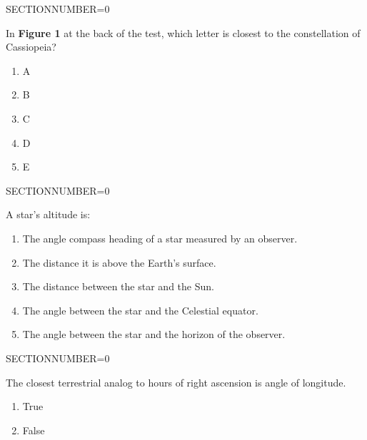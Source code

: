 \documentclass[11pt]{article}
\begin{document}
\begin{enumerate}
\begin{minipage}{\textwidth}
\begin{minipage}{\textwidth}
\end{minipage}
SECTIONNUMBER=0
\end{minipage}
\vskip 0.20in

\begin{minipage}{\textwidth}
\begin{minipage}{\textwidth}
\item In {\bf Figure 1} at the back of the test, which letter is closest to the constellation of  Cassiopeia?
\begin{multicols}{3}
\begin{enumerate} 
\setlength{\itemsep}{1pt} 
\setlength{\parskip}{0pt} 
\setlength{\parsep}{0pt}
\setlength{\multicolsep}{1pt} 
\item A
\item B
\item C
\item D
\item E
\end{enumerate} 
\vfill 
\end{multicols}

\end{minipage}
SECTIONNUMBER=0
\end{minipage}
\vskip 0.20in

\begin{minipage}{\textwidth}
\begin{minipage}{\textwidth}
\item A star's altitude is:
\begin{enumerate} 
\setlength{\itemsep}{1pt} 
\setlength{\parskip}{0pt} 
\setlength{\parsep}{0pt}
\setlength{\multicolsep}{1pt} 
\item The angle compass heading of a star measured by an observer.
\item The distance it is above the Earth's surface.
\item The distance between the star and the Sun.
\item The angle between the star and the Celestial equator.
\item The angle between the star and the horizon of the observer.
\end{enumerate} 
\end{minipage}
SECTIONNUMBER=0
\end{minipage}
\vskip 0.20in

\begin{minipage}{\textwidth}
\begin{minipage}{\textwidth}
\item The closest terrestrial analog to hours of right ascension is angle of longitude.
\begin{multicols}{3}
\begin{enumerate} 
\setlength{\itemsep}{1pt} 
\setlength{\parskip}{0pt} 
\setlength{\parsep}{0pt}
\setlength{\multicolsep}{1pt} 
\item True
\item False
\end{enumerate} 
\vfill 
\end{multicols}


\end{minipage}
\end{minipage}
\end{enumerate}
\end{document}
